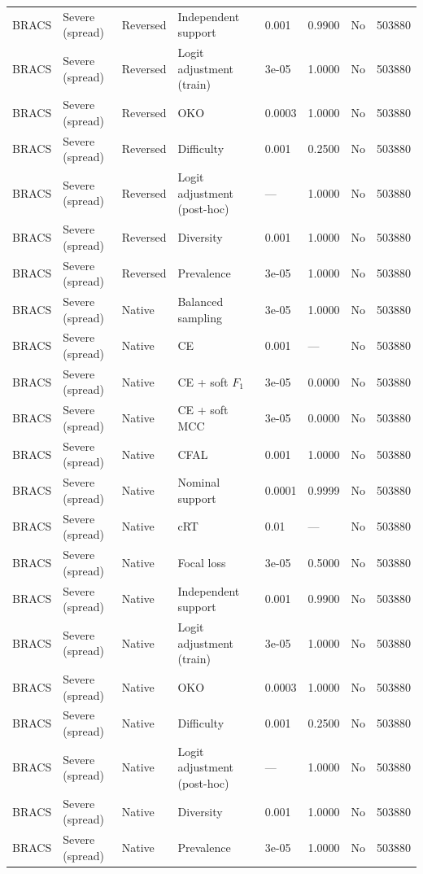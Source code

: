 \begin{longtable}{lllllllr}
BRACS & Severe (spread) & Reversed & Independent support & 0.001 & 0.9900 & No & 503880 \\
BRACS & Severe (spread) & Reversed & Logit adjustment (train) & 3e-05 & 1.0000 & No & 503880 \\
BRACS & Severe (spread) & Reversed & OKO & 0.0003 & 1.0000 & No & 503880 \\
BRACS & Severe (spread) & Reversed & Difficulty & 0.001 & 0.2500 & No & 503880 \\
BRACS & Severe (spread) & Reversed & Logit adjustment (post-hoc) & --- & 1.0000 & No & 503880 \\
BRACS & Severe (spread) & Reversed & Diversity & 0.001 & 1.0000 & No & 503880 \\
BRACS & Severe (spread) & Reversed & Prevalence & 3e-05 & 1.0000 & No & 503880 \\
BRACS & Severe (spread) & Native & Balanced sampling & 3e-05 & 1.0000 & No & 503880 \\
BRACS & Severe (spread) & Native & CE & 0.001 & --- & No & 503880 \\
BRACS & Severe (spread) & Native & CE + soft $F_1$ & 3e-05 & 0.0000 & No & 503880 \\
BRACS & Severe (spread) & Native & CE + soft MCC & 3e-05 & 0.0000 & No & 503880 \\
BRACS & Severe (spread) & Native & CFAL & 0.001 & 1.0000 & No & 503880 \\
BRACS & Severe (spread) & Native & Nominal support & 0.0001 & 0.9999 & No & 503880 \\
BRACS & Severe (spread) & Native & cRT & 0.01 & --- & No & 503880 \\
BRACS & Severe (spread) & Native & Focal loss & 3e-05 & 0.5000 & No & 503880 \\
BRACS & Severe (spread) & Native & Independent support & 0.001 & 0.9900 & No & 503880 \\
BRACS & Severe (spread) & Native & Logit adjustment (train) & 3e-05 & 1.0000 & No & 503880 \\
BRACS & Severe (spread) & Native & OKO & 0.0003 & 1.0000 & No & 503880 \\
BRACS & Severe (spread) & Native & Difficulty & 0.001 & 0.2500 & No & 503880 \\
BRACS & Severe (spread) & Native & Logit adjustment (post-hoc) & --- & 1.0000 & No & 503880 \\
BRACS & Severe (spread) & Native & Diversity & 0.001 & 1.0000 & No & 503880 \\
BRACS & Severe (spread) & Native & Prevalence & 3e-05 & 1.0000 & No & 503880 \\

\end{longtable}

